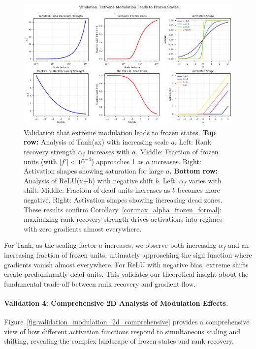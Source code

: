 \documentclass{article}
\numberwithin{figure}{section}
\begin{document}
\begin{figure}[ht!]
    \centering
    \includegraphics[width=0.9\linewidth]{validation_frozen_states.pdf}
    \caption{Validation that extreme modulation leads to frozen states. \textbf{Top row:} Analysis of Tanh(ax) with increasing scale $a$. Left: Rank recovery strength $\alpha_f$ increases with $a$. Middle: Fraction of frozen units (with $|f'| < 10^{-4}$) approaches 1 as $a$ increases. Right: Activation shapes showing saturation for large $a$. \textbf{Bottom row:} Analysis of ReLU(x+b) with negative shift $b$. Left: $\alpha_f$ varies with shift. Middle: Fraction of dead units increases as $b$ becomes more negative. Right: Activation shapes showing increasing dead zones. These results confirm Corollary~\ref{cor:max_alpha_frozen_formal}: maximizing rank recovery strength drives activations into regimes with zero gradients almost everywhere.}
    \label{fig:validation_frozen_states}
\end{figure}

For Tanh, as the scaling factor $a$ increases, we observe both increasing $\alpha_f$ and an increasing fraction of frozen units, ultimately approaching the sign function where gradients vanish almost everywhere. For ReLU with negative bias, extreme shifts create predominantly dead units. This validates our theoretical insight about the fundamental trade-off between rank recovery and gradient flow.

\paragraph{Validation 4: Comprehensive 2D Analysis of Modulation Effects.}
Figure~\ref{fig:validation_modulation_2d_comprehensive} provides a comprehensive view of how different activation functions respond to simultaneous scaling and shifting, revealing the complex landscape of frozen states and rank recovery.
\end{document}
